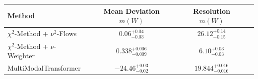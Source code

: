     \begin{tabular}{lccc}
        \toprule
        Method & Mean Deviation $m(W)$ & Resolution $m(W)$ \\
        \midrule
        $\chi^2$-Method + $\nu^2$-Flows & $0.06^{+0.04}_{-0.03}$ & $26.12^{+0.14}_{-0.15}$ \\
        $\chi^2$-Method + $\nu$-Weighter & $0.338^{+0.006}_{-0.009}$ & $6.10^{+0.03}_{-0.03}$ \\
        MultiModalTransformer & $-24.46^{+0.03}_{-0.02}$ & $19.844^{+0.016}_{-0.016}$ \\
        \bottomrule
    \end{tabular}